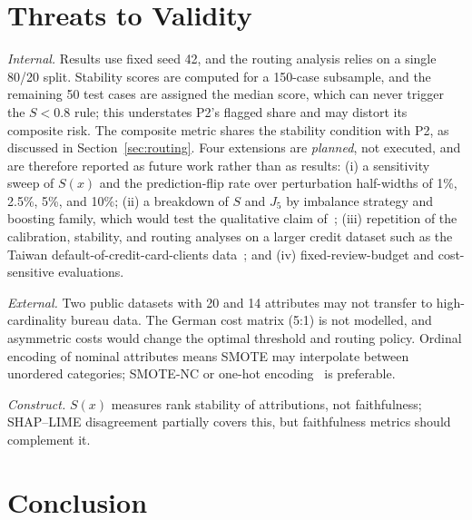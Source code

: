 \documentclass[journal]{IEEEtran}
\begin{document}
\section{Threats to Validity}
\label{sec:threats}

\emph{Internal.} Results use fixed seed 42, and the routing analysis relies on
a single 80/20 split. Stability scores are computed for a 150-case subsample,
and the remaining 50 test cases are assigned the median score, which can never
trigger the $S<0.8$ rule; this understates P2's flagged share and may distort
its composite risk. The composite metric shares the stability condition with
P2, as discussed in Section~\ref{sec:routing}. Four extensions are
\emph{planned}, not executed, and are therefore reported as future work rather
than as results: (i) a sensitivity sweep of $S(x)$ and the prediction-flip rate
over perturbation half-widths of 1\%, 2.5\%, 5\%, and 10\%; (ii) a breakdown of
$S$ and $J_5$ by imbalance strategy and boosting family, which would test the
qualitative claim of~\cite{tufail2026signal}; (iii) repetition of the
calibration, stability, and routing analyses on a larger credit dataset such
as the Taiwan default-of-credit-card-clients data~\cite{yeh2009comparisons};
and (iv) fixed-review-budget and cost-sensitive evaluations.

\emph{External.} Two public datasets with 20 and 14 attributes may not transfer
to high-cardinality bureau data. The German cost matrix (5:1) is not modelled,
and asymmetric costs would change the optimal threshold and routing policy.
Ordinal encoding of nominal attributes means SMOTE may interpolate between
unordered categories; SMOTE-NC or one-hot encoding~\cite{chawla2002smote} is
preferable.

\emph{Construct.} $S(x)$ measures rank stability of attributions, not
faithfulness; SHAP--LIME disagreement partially covers this, but faithfulness
metrics should complement it.

\section{Conclusion}
\label{sec:conclusion}
\end{document}
